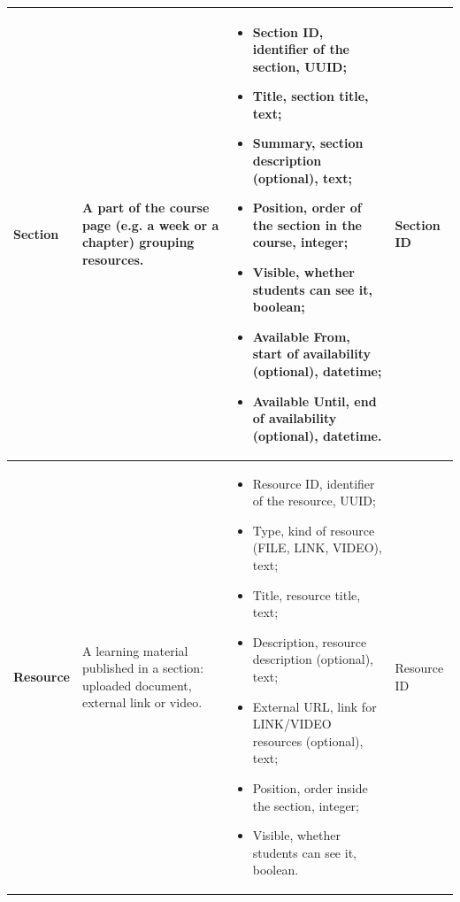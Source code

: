 {\begin{longtable}{|p{}|p{}|p{}|p{}|}
    \textbf{Section} & A part of the course page (e.g. a week or a chapter) grouping resources. &
    \begin{itemize}[leftmargin=*,nosep,before=\vspace{-\baselineskip}\leavevmode,after=\vspace{-\baselineskip}]
        \item Section ID, identifier of the section, UUID;
        \item Title, section title, text;
        \item Summary, section description (optional), text;
        \item Position, order of the section in the course, integer;
        \item Visible, whether students can see it, boolean;
        \item Available From, start of availability (optional), datetime;
        \item Available Until, end of availability (optional), datetime.
    \end{itemize}
    & Section ID \\ \hline

    \textbf{Resource} & A learning material published in a section: uploaded document, external link or video. &
    \begin{itemize}[leftmargin=*,nosep,before=\vspace{-\baselineskip}\leavevmode,after=\vspace{-\baselineskip}]
        \item Resource ID, identifier of the resource, UUID;
        \item Type, kind of resource (FILE, LINK, VIDEO), text;
        \item Title, resource title, text;
        \item Description, resource description (optional), text;
        \item External URL, link for LINK/VIDEO resources (optional), text;
        \item Position, order inside the section, integer;
        \item Visible, whether students can see it, boolean.
    \end{itemize}
    & Resource ID \\ \hline


\end{longtable}}
